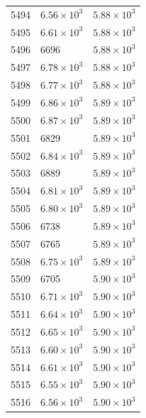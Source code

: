 \begin{table}[H]
\begin{tabular}{lll}
5494 & $\displaystyle 6.56 \times 10^{3}$ & $\displaystyle 5.88 \times 10^{3}$ \\
5495 & $\displaystyle 6.61 \times 10^{3}$ & $\displaystyle 5.88 \times 10^{3}$ \\
5496 & 6696 & $\displaystyle 5.88 \times 10^{3}$ \\
5497 & $\displaystyle 6.78 \times 10^{3}$ & $\displaystyle 5.88 \times 10^{3}$ \\
5498 & $\displaystyle 6.77 \times 10^{3}$ & $\displaystyle 5.88 \times 10^{3}$ \\
5499 & $\displaystyle 6.86 \times 10^{3}$ & $\displaystyle 5.89 \times 10^{3}$ \\
5500 & $\displaystyle 6.87 \times 10^{3}$ & $\displaystyle 5.89 \times 10^{3}$ \\
5501 & 6829 & $\displaystyle 5.89 \times 10^{3}$ \\
5502 & $\displaystyle 6.84 \times 10^{3}$ & $\displaystyle 5.89 \times 10^{3}$ \\
5503 & 6889 & $\displaystyle 5.89 \times 10^{3}$ \\
5504 & $\displaystyle 6.81 \times 10^{3}$ & $\displaystyle 5.89 \times 10^{3}$ \\
5505 & $\displaystyle 6.80 \times 10^{3}$ & $\displaystyle 5.89 \times 10^{3}$ \\
5506 & 6738 & $\displaystyle 5.89 \times 10^{3}$ \\
5507 & 6765 & $\displaystyle 5.89 \times 10^{3}$ \\
5508 & $\displaystyle 6.75 \times 10^{3}$ & $\displaystyle 5.89 \times 10^{3}$ \\
5509 & 6705 & $\displaystyle 5.90 \times 10^{3}$ \\
5510 & $\displaystyle 6.71 \times 10^{3}$ & $\displaystyle 5.90 \times 10^{3}$ \\
5511 & $\displaystyle 6.64 \times 10^{3}$ & $\displaystyle 5.90 \times 10^{3}$ \\
5512 & $\displaystyle 6.65 \times 10^{3}$ & $\displaystyle 5.90 \times 10^{3}$ \\
5513 & $\displaystyle 6.60 \times 10^{3}$ & $\displaystyle 5.90 \times 10^{3}$ \\
5514 & $\displaystyle 6.61 \times 10^{3}$ & $\displaystyle 5.90 \times 10^{3}$ \\
5515 & $\displaystyle 6.55 \times 10^{3}$ & $\displaystyle 5.90 \times 10^{3}$ \\
5516 & $\displaystyle 6.56 \times 10^{3}$ & $\displaystyle 5.90 \times 10^{3}$ \\

\end{tabular}
\end{table}
